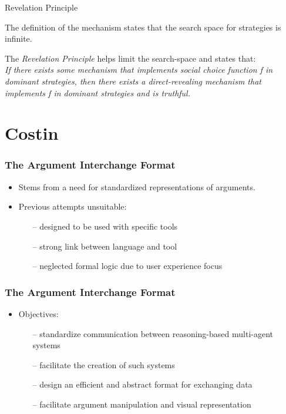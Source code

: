 \documentclass{beamer}
\begin{document}
\begin{frame}{Revelation Principle}

    \pause
    The definition of the mechanism states that the search space for strategies
    is infinite.\pause
    \vspace{5mm}

    The \emph{Revelation Principle} helps limit the search-space and states that:\\
    \pause
    \vspace{3mm}
    \emph{If there exists some mechanism that implements social choice
    function f in dominant strategies, then there exists a direct-revealing
    mechanism that implements f in dominant strategies and is truthful.}

\end{frame}

\section{Costin}
\begin{frame}
\frametitle{The Argument Interchange Format}
\begin{itemize}
\item Stems from a need for standardized representations of arguments. \pause
\item Previous attempts unsuitable: \pause
  \begin{itemize}
  \item[--] designed to be used with specific tools \pause
  \item[--] strong link between language and tool \pause
  \item[--] neglected formal logic due to user experience focus
  \end{itemize}
\end{itemize}
\end{frame}

\begin{frame}
\frametitle{The Argument Interchange Format}
\begin{itemize}
\item Objectives: \pause
  \begin{itemize}
  \item[--] standardize communication between reasoning-based multi-agent systems \pause
  \item[--] facilitate the creation of such systems \pause
  \item[--] design an efficient and abstract format for exchanging data \pause
  \item[--] facilitate argument manipulation and visual representation
  \end{itemize}
\end{itemize}
\end{frame}
\end{document}
